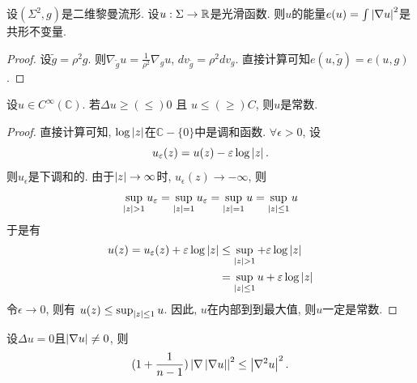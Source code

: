 \begin{lemma}
    设$(\Sigma^2,g)$是二维黎曼流形. 设$u: \Sigma \to \mathbb{R}$是光滑函数. 则$u$的能量$e(u)=\int \left | \nabla u \right |^2$是共形不变量.
\end{lemma}
\begin{proof}
    设$\tilde{g}=\rho^2g$.  则$\nabla_{\tilde{g}}u=\frac{1}{\rho^2}\nabla_gu$, $dv_{\tilde{g}}=\rho^2dv_g$. 直接计算可知$e(u,\tilde{g})=e(u,g)$.
\end{proof}
\begin{lemma}
    设$u\in C^{\infty}(\mathbb{C})$. 若$\Delta u  \ge(\le) 0$ 且 $u \le(\ge) C$, 则$u$是常数.
\end{lemma}
\begin{proof}
    直接计算可知, $\log\left | z \right |$在$\mathbb{C}-\{0\}$中是调和函数. $\forall \epsilon>0$, 设
    \begin{equation}
        u_\varepsilon(z)=u(z)-\varepsilon\log\left | z \right |.
    \end{equation}
    则$u_\epsilon$是下调和的. 由于$\left | z \right | \to \infty$时, $u_\epsilon(z) \to -\infty$, 则
    \begin{equation}
        \sup_{\abs{z}>1} u_\epsilon = \sup_{\abs{z}=1} u_\epsilon=\sup_{\abs{z}=1} u = \sup_{\abs{z} \le 1} u
    \end{equation}
    于是有
    \begin{equation}
        \begin{split}
            u(z)=u_\epsilon(z) + \epsilon\log\abs{z} &\le \sup_{\abs{z}>1} + \epsilon\log\abs{z} \\
            &= \sup_{\abs{z} \le 1}u + \epsilon\log\abs{z}
        \end{split}
    \end{equation}
    令$\epsilon \to 0$, 则有 $u(z) \le \sup_{\left | z \right | \le 1}u$. 因此, $u$在内部到到最大值, 则$u$一定是常数.
\end{proof}
\begin{lemma} \label{kato}
    设$\Delta u=0$且$\left | \nabla u \right | \ne 0$, 则
    \begin{equation}
        (1+\frac{1}{n-1}) \left | \nabla\left | \nabla u \right | \right |^2 \le \left | \nabla^2u \right |^2.
    \end{equation}
\end{lemma}

